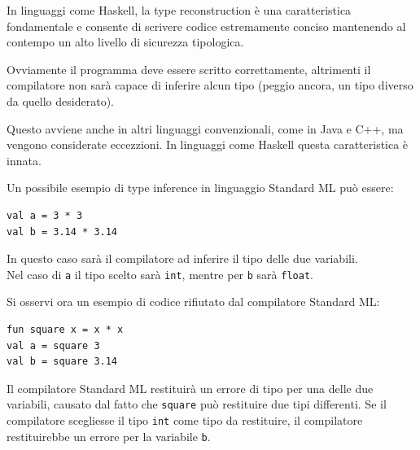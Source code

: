 \documentclass{article}
\begin{document}
In linguaggi come Haskell, la type reconstruction è una caratteristica fondamentale e consente di scrivere codice estremamente conciso mantenendo al contempo un alto livello di sicurezza tipologica.

Ovviamente il programma deve essere scritto correttamente, altrimenti il compilatore non sarà capace di inferire alcun tipo (peggio ancora, un tipo diverso da quello desiderato).

Questo avviene anche in altri linguaggi convenzionali, come in Java e C++, ma vengono considerate eccezzioni. In linguaggi come Haskell questa caratteristica è innata.

Un possibile esempio di type inference in linguaggio Standard ML può essere:
\begin{tcolorbox}
\begin{verbatim}
val a = 3 * 3
val b = 3.14 * 3.14
\end{verbatim}
\end{tcolorbox}
In questo caso sarà il compilatore ad inferire il tipo delle due variabili.\\
Nel caso di \texttt{a} il tipo scelto sarà \texttt{int}, mentre per \texttt{b} sarà \texttt{float}.

\pagebreak

Si osservi ora un esempio di codice rifiutato dal compilatore Standard ML:
\begin{tcolorbox}
\begin{verbatim}
fun square x = x * x
val a = square 3
val b = square 3.14
\end{verbatim}
\end{tcolorbox}
Il compilatore Standard ML restituirà un errore di tipo per una delle due variabili, causato dal fatto che \texttt{square} può restituire due tipi differenti. Se il compilatore scegliesse il tipo \texttt{int} come tipo da restituire, il compilatore restituirebbe un errore per la variabile \texttt{b}.
\end{document}
